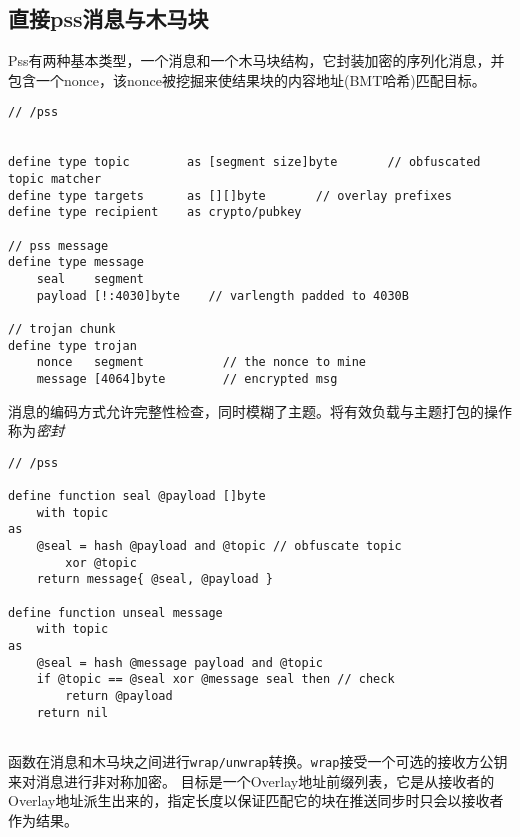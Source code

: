 \subsection{直接pss消息与木马块}

Pss有两种基本类型，一个消息和一个木马块结构，它封装加密的序列化消息，并包含一个nonce，该nonce被挖掘来使结果块的内容地址(BMT哈希)匹配目标。


\begin{definition}\label{def:pss-message}
\begin{lstlisting}[language=buzz1]
// /pss


define type topic        as [segment size]byte       // obfuscated topic matcher
define type targets      as [][]byte       // overlay prefixes 
define type recipient    as crypto/pubkey

// pss message
define type message 
    seal    segment            
    payload [!:4030]byte    // varlength padded to 4030B
    
// trojan chunk
define type trojan 
    nonce   segment           // the nonce to mine 
    message [4064]byte        // encrypted msg 
\end{lstlisting}
\end{definition}


消息的编码方式允许完整性检查，同时模糊了主题。将有效负载与主题打包的操作称为\emph{密封}


\begin{definition}\label{def:pss-sealing}
\begin{lstlisting}[language=buzz1]
// /pss

define function seal @payload []byte
    with topic
as
    @seal = hash @payload and @topic // obfuscate topic
        xor @topic          
    return message{ @seal, @payload }

define function unseal message
    with topic 
as
    @seal = hash @message payload and @topic 
    if @topic == @seal xor @message seal then // check 
        return @payload 
    return nil
    
\end{lstlisting}
\end{definition}

函数在消息和木马块之间进行\lstinline{wrap/unwrap}转换。\lstinline{wrap}接受一个可选的接收方公钥来对消息进行非对称加密。
目标是一个Overlay地址前缀列表，它是从接收者的Overlay地址派生出来的，指定长度以保证匹配它的块在推送同步时只会以接收者作为结果。   

